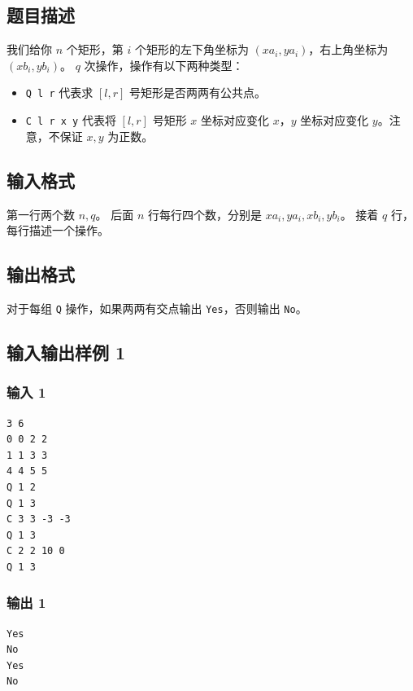 \documentclass[12pt,a4paper,oneside]{ctexart}
\begin{document}
\subsection*{题目描述}
我们给你 $n$ 个矩形，第 $i$ 个矩形的左下角坐标为 $(xa_i,ya_i)$，右上角坐标为 $(xb_i,yb_i)$。
$q$ 次操作，操作有以下两种类型：
\begin{itemize}
\item \texttt{Q l r} 代表求 $[l,r]$ 号矩形是否两两有公共点。
\end{itemize}
\begin{itemize}
\item \texttt{C l r x y} 代表将 $[l,r]$ 号矩形 $x$ 坐标对应变化 $x$，$y$ 坐标对应变化 $y$。注意，不保证 $x,y$ 为正数。
\end{itemize}
\subsection*{输入格式}
第一行两个数 $n,q$。
后面 $n$ 行每行四个数，分别是 $xa_i,ya_i,xb_i,yb_i$。
接着 $q$ 行，每行描述一个操作。
\subsection*{输出格式}
对于每组 \texttt{Q} 操作，如果两两有交点输出 \texttt{Yes}，否则输出 \texttt{No}。
\subsection*{输入输出样例 1}
\subsubsection*{输入 1}
\begin{verbatim}
3 6
0 0 2 2
1 1 3 3
4 4 5 5
Q 1 2
Q 1 3
C 3 3 -3 -3
Q 1 3
C 2 2 10 0
Q 1 3
\end{verbatim}
\subsubsection*{输出 1}
\begin{verbatim}
Yes
No
Yes
No
\end{verbatim}
\end{document}
